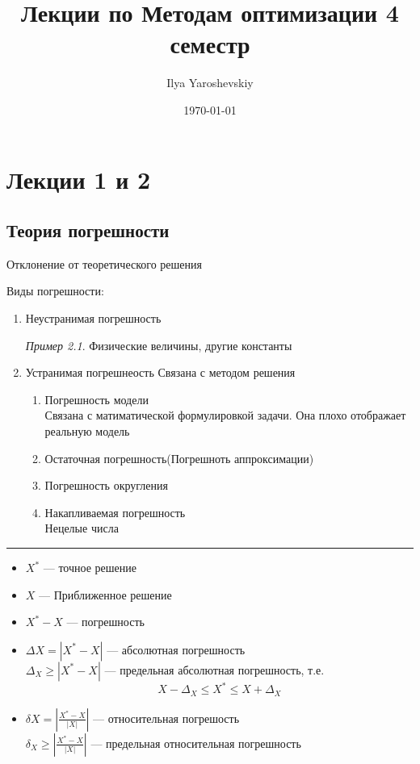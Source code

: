 \documentclass[oneside]{book}
\author{Ilya Yaroshevskiy}
\date{\today}
\title{Лекции по Методам оптимизации 4 семестр}
\theoremstyle{plain}
\theoremstyle{remark}
\newtheorem*{examp}{Пример}
\theoremstyle{definition}
\begin{document}
\maketitle
\tableofcontents


\chapter{}
\label{sec:org22e15d6}
\chapter{Лекции 1 и 2}
\label{sec:org87a464d}
\section{Теория погрешности}
\label{sec:org2558ce6}
\begin{defintion}
Отклонение от теоретического решения
\end{defintion}
Виды погрешности:
\begin{enumerate}
\item Неустранимая погрешность
\begin{examp}
Физические величины, другие константы
\end{examp}
\item Устранимая погрешнеость
Связана с методом решения
\begin{enumerate}
\item Погрешность модели \\
Связана с матиматической формулировкой задачи. Она плохо отображает реальную модель
\item Остаточная погрешность(Погрешноть аппроксимации)
\item Погрешность округления
\item Накапливаемая погрешность \\
Нецелые числа
\end{enumerate}
\end{enumerate}

\noindent\rule{\textwidth}{0.5pt}

\begin{itemize}
\item \(X^*\) --- точное решение \\
\item \(X\) --- Приближенное решение
\item \(X^* - X\) --- погрешность
\item \(\Delta X = |X^* - X|\) --- абсолютная погрешность \\
\(\Delta_X \ge |X^* - X|\) --- предельная абсолютная погрешность, т.е. \[ X - \Delta_X \le X^* \le X + \Delta_X \]
\item \(\delta X = \left|\frac{X^* - X}{|X|}\right|\) --- относительная погрешость \\
\(\delta_X \ge \left|\frac{X^* - X}{|X|}\right|\) --- предельная относительная погрешность
\end{itemize}
\end{document}
